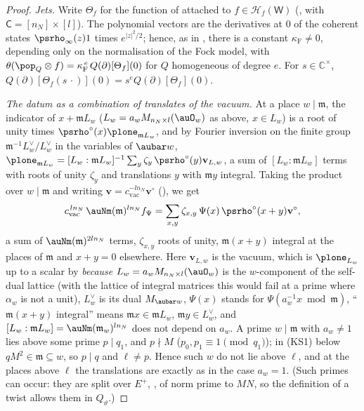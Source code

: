 \documentclass[10pt]{amsart}
\theoremstyle{definition}
\theoremstyle{remark}
\newcommand{\C}{\mathbb C}
\providecommand{\psHS}{\mathcal H}
\providecommand{\psvac}{\mathbf v}
\begin{document}
\begin{proof}
\emph{Jets.} Write $\Theta_f$ for the function of {\cite[(42)]{P49}} attached to $f\in\psHS_f(\mathsf
W)$ ({\cite[\S5.2.8]{P49}}, with $\mathsf C=[n_N]\times[l]$). The polynomial vectors are the
derivatives at $0$ of the coherent states $\psrho_\infty(z)1$ times $e^{|z|^2/2}$; hence, as in
{\cite[(34)]{P49}}, there is a constant $\kappa_{\mathrm F}\ne0$, depending only on the
normalisation of the Fock model, with $\theta(\pop_Q\otimes f)=\kappa_{\mathrm F}^{\,e}\,
Q(\partial)[\Theta_f](0)$ for $Q$ homogeneous of degree $e$. For $s\in\C^\times$, $Q(\partial)[\Theta_f
(s\,\cdot)](0)=s^eQ(\partial)[\Theta_f](0)$.

\emph{The datum as a combination of translates of the vacuum.} At a place $w\mid\mathfrak m$, the
indicator of $x+\mathfrak mL_w$ ($L_w=a_wM_{n_N\times l}(\auO_w)$ as above, $x\in L_w$) is a root of unity times
$\psrho^\circ(x)\plone_{\mathfrak mL_w}$, and by Fourier inversion on the finite group
$\mathfrak m^{-1}L^\vee_w/L^\vee_w$ in the variables of $\aubar w$,
$\plone_{\mathfrak mL_w}=[L_w:\mathfrak mL_w]^{-1}\sum_y\zeta_y\,\psrho^\circ(y)\psvac_{L,w}$, a sum of
$[L_w:\mathfrak mL_w]$ terms with roots of unity $\zeta_y$ and translations $y$ with $\mathfrak my$
integral. Taking the product over $w\mid\mathfrak m$ and writing $\psvac=c_{\mathrm{vac}}^{-ln_N}
\psvac^\circ$ ({\cite[(58)]{P49}}), we get
\begin{equation}\label{plf:eq-vacexp}
c_{\mathrm{vac}}^{\,ln_N}\,\auNm(\mathfrak m)^{ln_N}f_\Psi=\sum_{x,y}\zeta_{x,y}\,\Psi(x)\,
\psrho^\circ(x+y)\psvac^\circ ,
\end{equation}
a sum of $\auNm(\mathfrak m)^{2ln_N}$ terms, $\zeta_{x,y}$ roots of unity, $\mathfrak m(x+y)$ integral
at the places of $\mathfrak m$ and $x+y=0$ elsewhere.
Here $\psvac_{L,w}$ is the vacuum, which is $\plone_{L_w}$ up to a scalar by {\cite[Lemma~6.30]{P53}}
\emph{because} $L_w=a_wM_{n_N\times l}(\auO_w)$ is the $w$-component of the self-dual lattice (with
the lattice of integral matrices this would fail at a prime where $\alpha_w$ is not a unit),
$L_w^\vee$ is its dual $M_{\aubar w}$, $\Psi(x)$ stands for $\Psi(a_w^{-1}x\bmod\mathfrak m)$,
``$\mathfrak m(x+y)$ integral'' means $\mathfrak mx\in\mathfrak mL_w$, $\mathfrak my\in L^\vee_w$, and
$[L_w:\mathfrak mL_w]=\auNm(\mathfrak m_w)^{ln_N}$ does not depend on $a_w$. A prime $w\mid\mathfrak m$
with $a_w\ne1$ lies above some prime $p\mid q_1$, and $p\nmid M$ ($p_0,p_1\equiv1\pmod{q_1}$); in
(KS1) below $qM^2\in\mathfrak m\subseteq w$, so $p\mid q$ and $\ell\ne p$. Hence such $w$ do not lie above
$\ell$, and at the places above $\ell$ the translations are exactly as in the case $a_w=1$. (Such
primes can occur: they are split over $E^+$, {\cite[Proposition~6.9(b)]{P53}}, of norm prime to $MN$, so
the definition of a twist allows them in $Q_\vartheta$.)


\end{proof}
\end{document}

